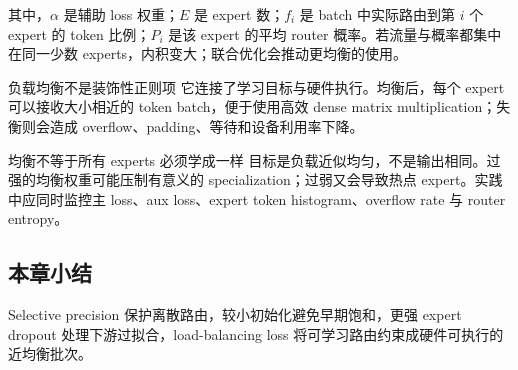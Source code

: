 其中，$\alpha$ 是辅助 loss 权重；$E$ 是 expert 数；$f_i$ 是 batch 中实际路由到第 $i$ 个 expert 的 token 比例；$P_i$ 是该 expert 的平均 router 概率。若流量与概率都集中在同一少数 experts，内积变大；联合优化会推动更均衡的使用。


\begin{importantbox}{负载均衡不是装饰性正则项}
它连接了学习目标与硬件执行。均衡后，每个 expert 可以接收大小相近的 token batch，便于使用高效 dense matrix multiplication；失衡则会造成 overflow、padding、等待和设备利用率下降。
\end{importantbox}

\begin{warningbox}{均衡不等于所有 experts 必须学成一样}
目标是负载近似均匀，不是输出相同。过强的均衡权重可能压制有意义的 specialization；过弱又会导致热点 expert。实践中应同时监控主 loss、aux loss、expert token histogram、overflow rate 与 router entropy。
\end{warningbox}

\subsection{本章小结}

Selective precision 保护离散路由，较小初始化避免早期饱和，更强 expert dropout 处理下游过拟合，load-balancing loss 将可学习路由约束成硬件可执行的近均衡批次。

